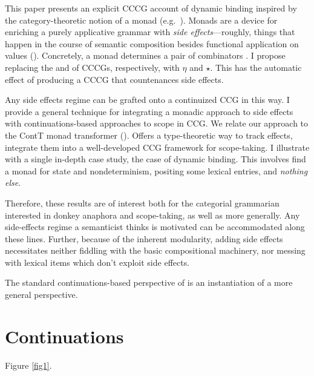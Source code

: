 	
	This paper presents an explicit CCCG account of dynamic binding inspired by the category-theoretic notion of a monad (e.g.~\citealt{Moggi:1989, Wadler:1992, Wadler:1994, Wadler:1995, Shan:2002}). Monads are a device for enriching a purely applicative grammar with \emph{side effects}---roughly, things that happen in the course of semantic composition besides functional application on values (\citealt{Shan:2005}). Concretely, a monad determines a pair of combinators \ab{\eta,\,\star}. I propose replacing the  and  of CCCGs, respectively, with $\eta$ and $\star$. This has the automatic effect of producing a CCCG that countenances side effects.%
	
	 Any side effects regime can be grafted onto a continuized CCG in this way. I provide a general technique for integrating a monadic approach to side effects with continuations-based approaches to scope in CCG. We relate our approach to the ContT monad transformer (\citealt{Liangetal}). Offers a type-theoretic way to track effects, integrate them into a well-developed CCG framework for scope-taking. I illustrate with a single in-depth case study, the case of dynamic binding. This involves find a monad for state and nondeterminism, positing some lexical entries, and \emph{nothing else}.%
	
	Therefore, these results are of interest both for the categorial grammarian interested in donkey anaphora and scope-taking, as well as more generally. Any side-effects regime a semanticist thinks is motivated can be accommodated along these lines. Further, because of the inherent modularity, adding side effects necessitates neither fiddling with the basic compositional machinery, nor messing with lexical items which don't exploit side effects.%
	
	The standard continuations-based perspective of \citealt{Barker:2002, ShanBarker:2006, BarkerShan:2014} is an instantiation of a more general perspective.%

\section{Continuations}
	Figure \ref{fig1}.

